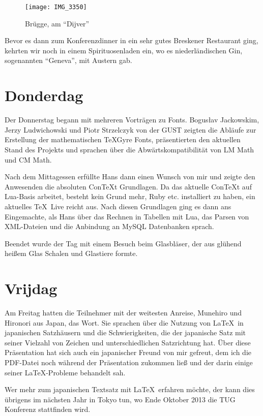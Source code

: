 \documentclass[12pt,ngerman]{dtk}
\begin{document}
\begin{figure}
\centering
\texttt{[image: IMG\_3350]}
\caption{Brügge, am \enquote{Dijver}}
\end{figure}

Bevor es dann zum Konferenzdinner in ein sehr gutes Breskener Restaurant ging, kehrten wir noch in einem Spirituosenladen ein, wo es niederländischen Gin, sogenannten \enquote{Geneva}, mit Austern gab.

\section{Donderdag}

Der Donnerstag begann mit mehreren Vorträgen zu Fonts. Bogus\l av Jackowskim, Jerzy Ludwichowski und Piotr Strzelczyk von der GUST zeigten die Abläufe zur Erstellung der mathematischen \TeX Gyre Fonts, präsentierten den aktuellen Stand des Projekts und sprachen über die Abwärtskompatibilität von LM Math und CM Math.

Nach dem Mittagessen erfüllte Hans dann einen Wunsch von mir und zeigte den Anwesenden die absoluten Con\TeX t Grundlagen. Da das aktuelle Con\TeX t auf Lua-Basis arbeitet, besteht kein Grund mehr, Ruby etc. installiert zu haben, ein aktuelles \TeX\ Live reicht aus. Nach diesen Grundlagen ging es dann ans Eingemachte, als Hans über das Rechnen in Tabellen mit Lua, das Parsen von XML-Dateien und die Anbindung an MySQL Datenbanken sprach.

Beendet wurde der Tag mit einem Besuch beim Glasbläser, der aus glühend heißem Glas Schalen und Glastiere formte.

\section{Vrijdag}

Am Freitag hatten die Teilnehmer mit der weitesten Anreise, Munehiro und  Hironori aus Japan, das Wort. Sie sprachen über die Nutzung von \LaTeX\ in japanischen Satzhäusern und die Schwierigkeiten, die der japanische Satz mit seiner Vielzahl von Zeichen und unterschiedlichen Satzrichtung hat. Über diese Präsentation hat sich auch ein japanischer Freund von mir gefreut, dem ich die PDF-Datei noch während der Präsentation zukommen ließ und der darin einige seiner \LaTeX-Probleme behandelt sah.

Wer mehr zum japanischen Textsatz mit \LaTeX\ erfahren möchte, der kann dies übrigens im nächsten Jahr in Tokyo tun, wo Ende Oktober 2013 die TUG Konferenz stattfinden wird.
\end{document}
